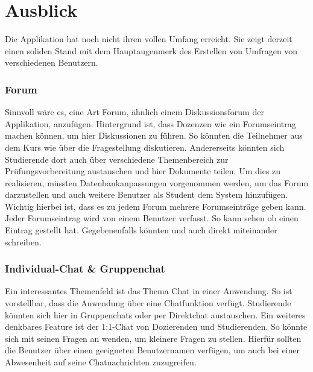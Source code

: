 \section{Ausblick}
\label{sec:Ausblick}

Die Applikation hat noch nicht ihren vollen Umfang erreicht.
Sie zeigt derzeit einen soliden Stand mit dem Hauptaugenmerk des Erstellen von Umfragen von verschiedenen Benutzern.

\subsubsection*{Forum}
Sinnvoll wäre es, eine Art Forum, ähnlich einem Diskussionsforum der Applikation, anzufügen.
Hintergrund ist, dass \zb Dozenzen wie \duzi ein Forumseintrag machen können, um hier Diskussionen zu führen.
So könnten die Teilnehmer aus dem Kurs wie \weigert über die Fragestellung diskutieren.
Andererseits könnten sich Studierende dort auch über verschiedene Themenbereich zur Prüfungsvorbereitung austauschen und hier Dokumente teilen. \newline
Um dies zu realisieren, müssten Datenbankanpassungen vorgenommen werden, um das Forum darzustellen und auch weitere Benutzer als Student dem System hinzufügen.
Wichtig hierbei ist, dass es zu jedem Forum mehrere Forumseinträge geben kann.
Jeder Forumseintrag wird von einem Benutzer verfasst. \newline
So kann \duzi sehen ob \weigert einen Eintrag gestellt hat.
Gegebenenfalls könnten \duzi und \weigert auch direkt miteinander schreiben.

\subsubsection*{Individual-Chat \& Gruppenchat}
Ein interessantes Themenfeld ist das Thema Chat in einer Anwendung.
So ist vorstellbar, dass die Anwendung über eine Chatfunktion verfügt.
Studierende könnten sich hier in Gruppenchats oder per Direktchat austauschen.
Ein weiteres denkbares Feature ist der 1:1-Chat von Dozierenden und Studierenden.
So könnte sich \weigert mit seinen Fragen an \duzi wenden, um kleinere Fragen zu stellen. \newline
Hierfür sollten die Benutzer über einen geeigneten Benutzernamen verfügen, um auch bei einer Abwesenheit auf seine Chatnachrichten zuzugreifen.
